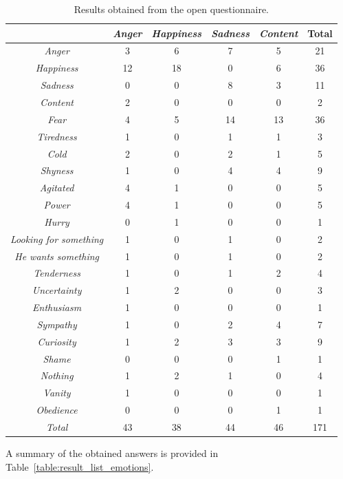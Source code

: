 \begin{table}
\centering
		\caption{Results obtained from the open questionnaire.}
		\label{table:open_questionnaire}
		\small
			\begin{tabular}{|c|c|c|c|c|c|}
				\hline
					\backslashbox{Presented}{Reported}&\textit{Anger}&\textit{Happiness}&\textit{Sadness}&\textit{Content}&Total\\
				\hline
					\textit{Anger}& 3&6&7&5&21\\
				\hline
					\textit{Happiness}&12& 18&0&6&36\\
				\hline
					\textit{Sadness}&0&0& 8&3&11\\
				\hline
					\textit{Content}&2&0&0& 0&2\\
				\hline
					\textit{Fear}&4&5&14&13&36\\
				\hline
					\textit{Tiredness}&1&0&1&1&3\\
				\hline
					\textit{Cold}&2&0&2&1&5\\
				\hline
					\textit{Shyness}&1&0&4&4&9\\
				\hline
					\textit{Agitated}&4&1&0&0&5\\
				\hline
					\textit{Power}&4&1&0&0&5\\
				\hline
					\textit{Hurry}&0&1&0&0&1\\
				\hline
					\textit{Looking for something}&1&0&1&0&2\\
				\hline
					\textit{He wants something}&1&0&1&0&2\\
				\hline
					\textit{Tenderness}&1&0&1&2&4\\
				\hline
					\textit{Uncertainty}&1&2&0&0&3\\
				\hline
					\textit{Enthusiasm}&1&0&0&0&1\\
				\hline
					\textit{Sympathy}&1&0&2&4&7\\
				\hline
					\textit{Curiosity}&1&2&3&3&9\\
				\hline
					\textit{Shame}&0&0&0&1&1\\
				\hline
					\textit{Nothing}&1&2&1&0&4\\
				\hline
					\textit{Vanity}&1&0&0&0&1\\
				\hline
					\textit{Obedience}&0&0&0&1&1\\
				\hline
					\textit{Total}&43&38&44&46&171\\
				\hline
			\end{tabular}
\end{table}
A summary of the obtained answers is provided in Table~\ref{table:result_list_emotions}.
